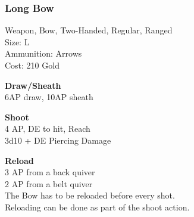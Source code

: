 \subsubsection{Long Bow}\label{weapon:longBow}
Weapon, Bow, Two-Handed, Regular, Ranged\\
Size: L\\
Ammunition: Arrows\\
Cost: 210 Gold

\textbf{Draw/Sheath}\\
6AP draw, 10AP sheath

\textbf{Shoot}\\
4 AP, DE to hit,  Reach\\
3d10 + \texttimes DE Piercing Damage

\textbf{Reload}\\
3 AP from a back quiver\\
2 AP from a belt quiver\\
The Bow has to be reloaded before every shot.\\
Reloading can be done as part of the shoot action.